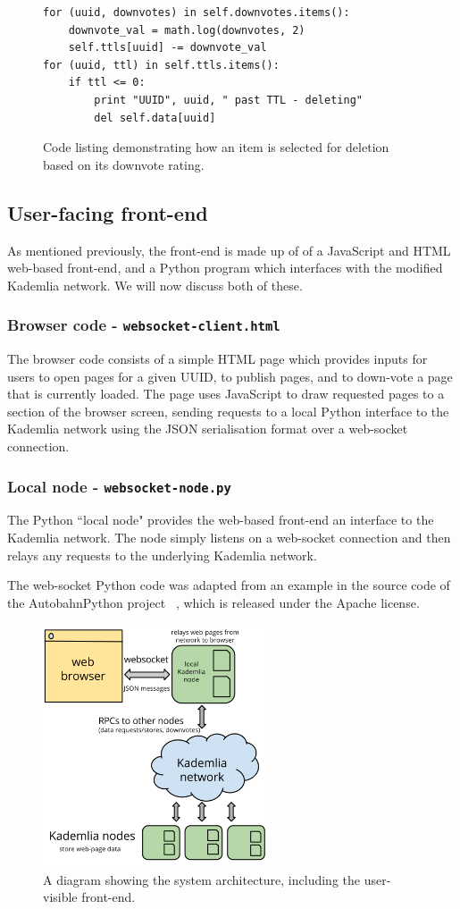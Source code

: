 \begin{figure}[H]
	\begin{lstlisting}
for (uuid, downvotes) in self.downvotes.items():
    downvote_val = math.log(downvotes, 2)
    self.ttls[uuid] -= downvote_val
for (uuid, ttl) in self.ttls.items():
    if ttl <= 0:
        print "UUID", uuid, " past TTL - deleting"
        del self.data[uuid]
	\end{lstlisting}
    \caption{Code listing demonstrating how an item is selected for deletion based on its downvote rating.}
    \label{fig:code-downvote}
\end{figure}

\subsection{User-facing front-end}

As mentioned previously, the front-end is made up of of a JavaScript and HTML web-based front-end, and a Python program which
interfaces with the modified Kademlia network. We will now discuss both of these.

\subsubsection{Browser code - \texttt{websocket-client.html}}

The browser code consists of a simple HTML page which provides inputs for users to open pages for a given UUID, to publish pages,
and to down-vote a page that is currently loaded. The page uses JavaScript to draw requested pages to a section of the browser screen,
sending requests to a local Python interface to the Kademlia network using the JSON serialisation format over a web-socket connection.

\subsubsection{Local node - \texttt{websocket-node.py}}

The Python ``local node" provides the web-based front-end an interface to the Kademlia network. The node simply listens on a web-socket connection
and then relays any requests to the underlying Kademlia network.

The web-socket Python code was adapted from an example in the source code of the AutobahnPython project ~\cite{websocket}, which is released
under the Apache license. 

\begin{figure}[H]
    \centering
    \includegraphics[width=0.6\textwidth]{img/arch-frontend.png}
    \caption{A diagram showing the system architecture, including the user-visible front-end.}
    \label{fig:arch-frontend}
\end{figure}
